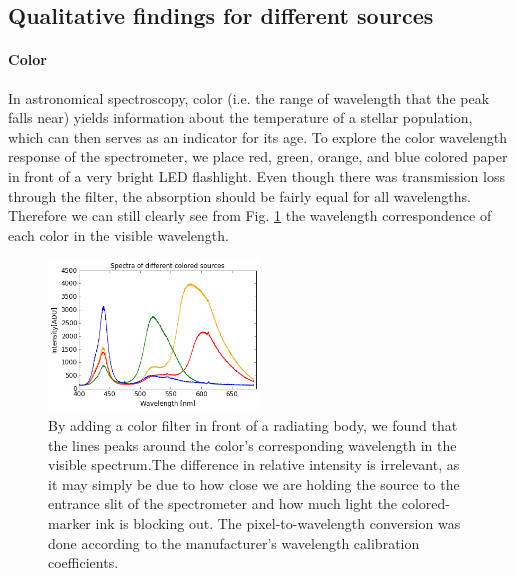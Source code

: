 \documentclass[authoryear,12pt,5p,times]{elsarticle}
\begin{document}
	\subsection{Qualitative findings for different sources}
	\paragraph*{\textbf{Color}}
	
	 In astronomical spectroscopy, color (i.e. the range of wavelength that the peak falls near) yields information about the temperature of a stellar population, which can then serves as an indicator for its age. To explore the color wavelength response of the spectrometer, we place red, green, orange, and blue colored paper in front of a very bright LED flashlight. Even though there was transmission loss through the filter, the absorption should be fairly equal for all wavelengths. Therefore we can still clearly see from  Fig. \ref{color} the wavelength correspondence of each color  in the visible wavelength. 
	\begin{figure}[h!]
\includegraphics[width=0.5\textwidth]{figures/color}
\caption{ By adding a color filter in front of a radiating body, we found that the lines peaks around the color's corresponding wavelength in the visible spectrum.The difference in relative intensity is irrelevant, as it may simply be due to how close we are holding the source to the entrance slit of the spectrometer and how much light the colored-marker ink is blocking out. The pixel-to-wavelength conversion was done according to the manufacturer's wavelength calibration coefficients.}
\label{color}
\end{figure}
\end{document}
